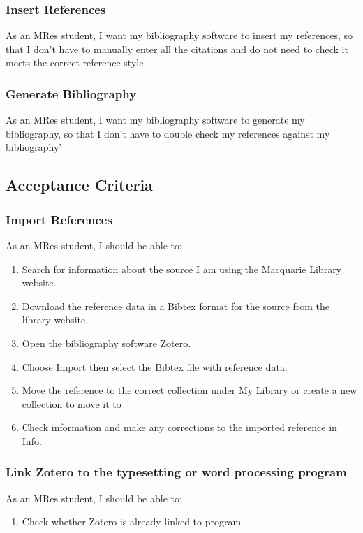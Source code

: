 \documentclass{article}
\begin{document}
\subsubsection*{Insert References}

As an MRes student, I want my bibliography software to insert my references, so that I don’t have to manually enter all the citations and do not need to check it meets the correct reference style.

\subsubsection*{Generate Bibliography}

As an MRes student, I want my bibliography software to generate my bibliography, so that I don’t have to double check my references against my bibliography’

\subsection*{Acceptance Criteria}

\subsubsection*{Import References}

As an MRes student, I should be able to:
\begin{enumerate} 
\item Search for information about the source I am using the Macquarie Library website. 
\item Download the reference data in a Bibtex format for the source from the library website. 
\item Open the bibliography software Zotero. 
\item Choose Import then select the Bibtex file with reference data. 
\item Move the reference to the correct collection under My Library or create a new collection to move it to
\item Check information and make any corrections to the imported reference in Info.
\end{enumerate} 

\subsubsection*{Link Zotero to the typesetting or word processing program}

As an MRes student, I should be able to: 
\begin{enumerate} 
\item Check whether Zotero is already linked to program.
\end{enumerate} 
\end{document}
